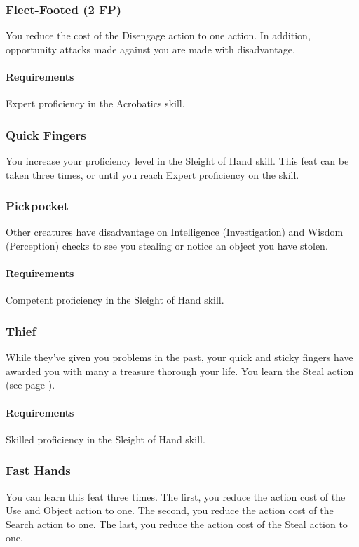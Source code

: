 \subsubsection{Fleet-Footed (2 FP)} \label{feat::fleetfooted}
    You reduce the cost of the Disengage action to one action.
    In addition, opportunity attacks made against you are made with disadvantage.
    \paragraph{Requirements} Expert proficiency in the Acrobatics skill.
\subsubsection{Quick Fingers} \label{feat::quickfingers}
    You increase your proficiency level in the Sleight of Hand skill.
    This feat can be taken three times, or until you reach Expert proficiency on the skill.
\subsubsection{Pickpocket} \label{feat::pickpocket}
    Other creatures have disadvantage on Intelligence (Investigation) and Wisdom (Perception) checks to see you stealing or notice an object you have stolen.
    \paragraph{Requirements} Competent proficiency in the Sleight of Hand skill.
\subsubsection{Thief} \label{feat::thief}
    While they've given you problems in the past, your quick and sticky fingers have awarded you with many a treasure thorough your life.
    You learn the Steal action (see page \pageref{act::steal}).
    \paragraph{Requirements} Skilled proficiency in the Sleight of Hand skill.
\subsubsection{Fast Hands} \label{feat::fasthands}
    You can learn this feat three times.
    The first, you reduce the action cost of the Use and Object action to one.
    The second, you reduce the action cost of the Search action to one.
    The last, you reduce the action cost of the Steal action to one.
